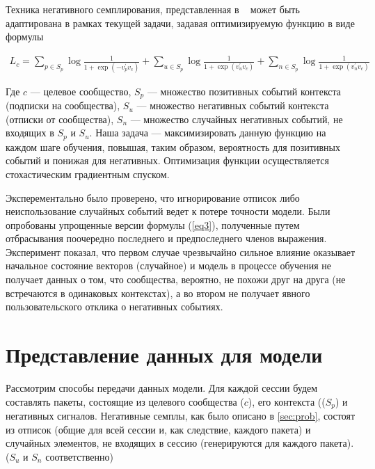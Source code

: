 \documentclass[times,specification,annotation]{itmo-student-thesis}
\begin{document}

Техника негативного семплирования, представленная в ~\cite{airbnb} может быть адаптирована в рамках текущей задачи, задавая оптимизируемую функцию в виде формулы

\begin{align}
L_c = \sum_{p \in S_p} \log \frac{1}{1 + \exp(-v_p^{'}v_c)} + \sum_{u \in S_p} \log \frac{1}{1 + \exp(v_u^{'}v_c)} + \sum_{n \in S_p} \log \frac{1}{1 + \exp(v_n^{'}v_c)} \label{eq3}
\end{align}

Где $c$ --- целевое сообщество, $S_p$ --- множество позитивных событий
контекста (подписки на сообщества), $S_u$ --- множество негативных событий
контекста (отписки от сообщества), $S_n$ --- множество случайных негативных
событий, не входящих в $S_p$ и $S_u$. Наша задача --- максимизировать данную
функцию на каждом шаге обучения, повышая, таким образом, вероятность для
позитивных событий и понижая для негативных. Оптимизация функции осуществляется стохастическим градиентным спуском. 

Эксперементально было проверено, что игнорирование отписок либо неиспользование случайных событий ведет к потере точности модели. Были опробованы упрощенные версии формулы (\ref{eq3}), полученные путем отбрасывания
поочередно последнего и предпоследнего членов выражения. Эксперимент показал, что первом случае чрезвычайно сильное
влияние оказывает начальное состояние векторов (случайное) и модель в процессе обучения не получает данных о том, что сообщества, вероятно,
не похожи друг на друга (не встречаются в одинаковых контекстах), а во втором не получает явного пользовательского отклика о негативных событиях. 

\section{Представление данных для модели}

Рассмотрим способы передачи данных модели.
Для каждой сессии будем составлять пакеты, состоящие из целевого
сообщества ($c$), его контекста (($S_p$) и негативных сигналов. Негативные семплы, как было
описано в \ref{sec:prob}, состоят из отписок (общие для всей сессии и, как следствие,
каждого пакета) и случайных элементов, не входящих в сессию (генерируются для
каждого пакета). ($S_u$ и $S_n$ соответственно)
\end{document}
